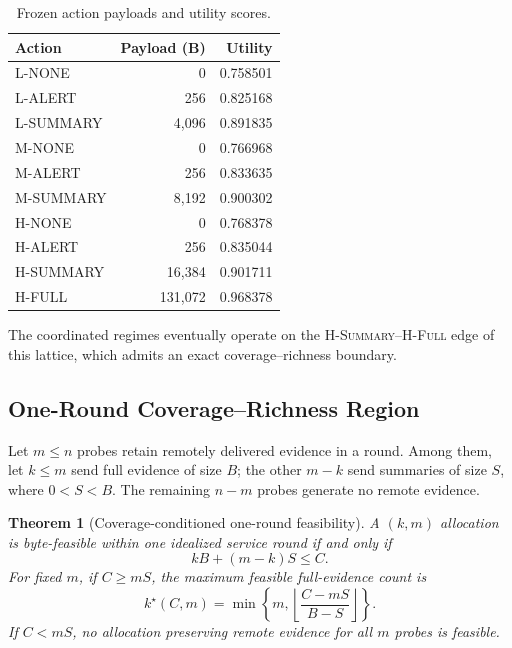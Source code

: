 \documentclass[10pt,journal]{IEEEtran}
\newtheorem{theorem}{Theorem}
\newcommand{\Hsummary}{\textsc{H-Summary}}
\newcommand{\Hfull}{\textsc{H-Full}}
\begin{document}
\begin{table}[t]
\centering
\caption{Frozen action payloads and utility scores.}
\label{tab:actions}
\scriptsize
\begin{tabular}{@{}lrr@{}}
\toprule
Action & Payload (B) & Utility \\
\midrule
L-NONE    & 0      & 0.758501 \\
L-ALERT   & 256    & 0.825168 \\
L-SUMMARY & 4,096  & 0.891835 \\
M-NONE    & 0      & 0.766968 \\
M-ALERT   & 256    & 0.833635 \\
M-SUMMARY & 8,192  & 0.900302 \\
H-NONE    & 0      & 0.768378 \\
H-ALERT   & 256    & 0.835044 \\
H-SUMMARY & 16,384 & 0.901711 \\
H-FULL    & 131,072& 0.968378 \\
\bottomrule
\end{tabular}
\end{table}

The coordinated regimes eventually operate on the \Hsummary--\Hfull{}
edge of this lattice, which admits an exact coverage--richness boundary.

\subsection{One-Round Coverage--Richness Region}
Let $m\leq n$ probes retain remotely delivered evidence in a round. Among
them, let $k\leq m$ send full evidence of size $B$; the other $m-k$ send
summaries of size $S$, where $0<S<B$. The remaining $n-m$ probes generate no
remote evidence.

\begin{theorem}[Coverage-conditioned one-round feasibility]
\label{thm:frontier}
A $(k,m)$ allocation is byte-feasible within one idealized service round if
and only if
\begin{equation}
kB+(m-k)S\leq C.
\label{eq:feasible}
\end{equation}
For fixed $m$, if $C\geq mS$, the maximum feasible full-evidence count is
\begin{equation}
k^\star(C,m)=
\min\left\{m,\left\lfloor\frac{C-mS}{B-S}\right\rfloor\right\}.
\label{eq:kstar}
\end{equation}
If $C<mS$, no allocation preserving remote evidence for all $m$ probes is
feasible.
\end{theorem}
\end{document}
